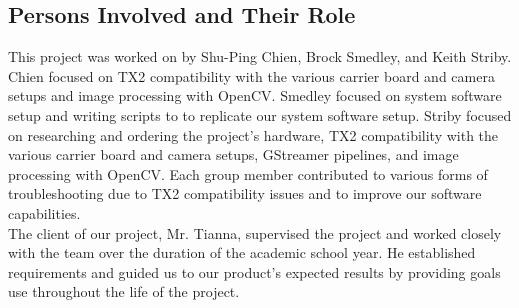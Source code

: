\subsection{Persons Involved and Their Role}

This project was worked on by Shu-Ping Chien, Brock Smedley, and Keith Striby. Chien 
focused on TX2 compatibility with the various carrier board and camera setups and image 
processing with OpenCV. Smedley focused on system software setup and writing scripts to 
to replicate our system software setup. Striby focused on researching and ordering 
the project's hardware, TX2 compatibility with the 
various carrier board and camera setups, GStreamer pipelines, and image processing with 
OpenCV. Each group member contributed to various forms of troubleshooting due to 
TX2 compatibility issues and to improve our software capabilities.  \\

The client of our project, Mr. Tianna, supervised the project and worked closely with the 
team over the duration of the 
academic school year. He established requirements and guided us to our 
product's expected results by providing goals use throughout the life of the project. \\